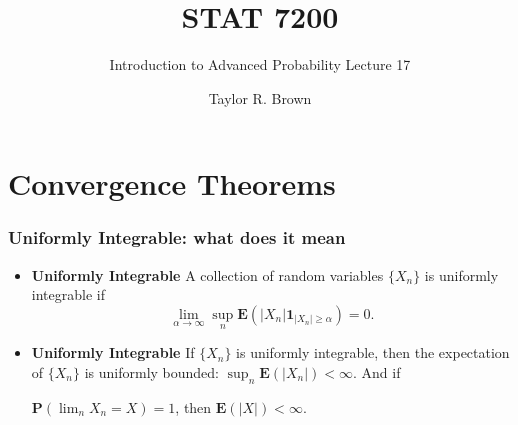 \documentclass[handout]{beamer}
\title{STAT 7200}
\subtitle{Introduction to Advanced Probability \newline Lecture 17}
\author{Taylor R. Brown}
\institute{}
\date{}
\newcommand{\BP}{\mathbf{P}}
\newcommand{\BE}{\mathbf{E}}
\newcommand{\BI}{\mathbf{1}}
\begin{document}
\frame{\titlepage}


\section[Outline]{}
\frame{\tableofcontents}



\section{Convergence Theorems}





\frame
{
  \frametitle{Uniformly Integrable: what does it mean} 

\begin{itemize}
   

\item<1-> \textbf{Uniformly Integrable} A collection of random variables $\{X_n\}$ is uniformly integrable if $$\lim_{\alpha\rightarrow \infty} \sup_n \BE(|X_n| \BI_{|X_n|\geq \alpha})=0.$$
                                                             
 \item<2-> \textbf{Uniformly Integrable} If $\{X_n\}$ is uniformly integrable, then the expectation of $\{X_n\}$ is uniformly bounded:  $\sup_n \BE(|X_n|)<\infty$. And if 
                               
$\BP(\lim_n X_n=X)=1$, then $\BE(|X|)<\infty$.                               
                              \end{itemize}
}
\end{document}
